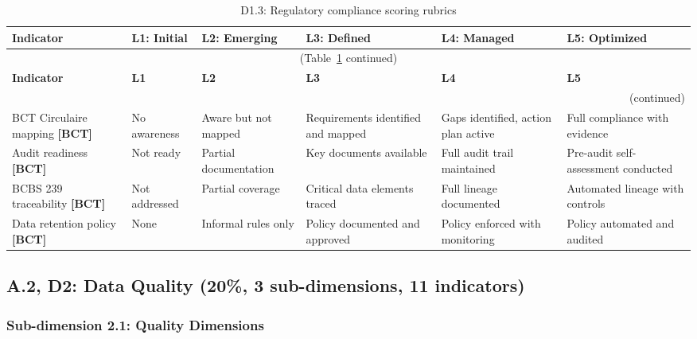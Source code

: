 \begin{center}
{\small
\begin{longtable}{|p{2.4cm}|p{2.0cm}|p{2.0cm}|p{2.2cm}|p{2.2cm}|p{2.2cm}|}
\caption{D1.3: Regulatory compliance scoring rubrics} \label{tab:d1-3} \\
\hline
\textbf{Indicator} & \textbf{L1: Initial} & \textbf{L2: Emerging} & \textbf{L3: Defined} & \textbf{L4: Managed} & \textbf{L5: Optimized} \\
\hline
\endfirsthead
\multicolumn{6}{c}{\small (Table~\ref{tab:d1-3} continued)} \\
\hline
\textbf{Indicator} & \textbf{L1} & \textbf{L2} & \textbf{L3} & \textbf{L4} & \textbf{L5} \\
\hline
\endhead
\hline
\multicolumn{6}{r}{\small (continued)} \\
\endfoot
\hline
\endlastfoot
BCT Circulaire mapping \textbf{[BCT]} &
  No awareness &
  Aware but not mapped &
  Requirements identified and mapped &
  Gaps identified, action plan active &
  Full compliance with evidence \\
\hline
Audit readiness \textbf{[BCT]} &
  Not ready &
  Partial documentation &
  Key documents available &
  Full audit trail maintained &
  Pre-audit self-assessment conducted \\
\hline
BCBS 239 traceability \textbf{[BCT]} &
  Not addressed &
  Partial coverage &
  Critical data elements traced &
  Full lineage documented &
  Automated lineage with controls \\
\hline
Data retention policy \textbf{[BCT]} &
  None &
  Informal rules only &
  Policy documented and approved &
  Policy enforced with monitoring &
  Policy automated and audited \\
\hline
\end{longtable}
}
\end{center}


\subsection*{A.2, D2: Data Quality (20\%, 3 sub-dimensions, 11 indicators)}

\subsubsection*{Sub-dimension 2.1: Quality Dimensions}

